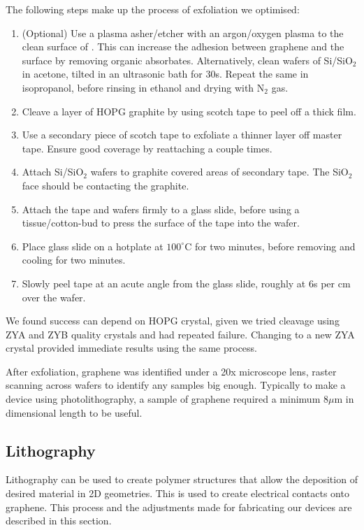 \documentclass[../../Matt_Gebert_Honours_Thesis.tex]{subfiles}
\begin{document}
	The following steps make up the process of exfoliation we optimised:
	\begin{enumerate}
		\itemsep 0em
		\item (Optional) Use a plasma asher/etcher with an argon/oxygen plasma to the clean surface of \silicondioxide. This can increase the adhesion between graphene and the surface by removing organic absorbates\cite{huang_reliable_2015}. Alternatively, clean wafers of Si/SiO$_2$ in acetone, tilted in an ultrasonic bath for 30s. Repeat the same in isopropanol, before rinsing in ethanol and drying with N$_2$ gas.
		\item Cleave a layer of HOPG graphite by using scotch tape to peel off a thick film.
		\item Use a secondary piece of scotch tape to exfoliate a thinner layer off master tape. Ensure good coverage by reattaching a couple times. 
		\item Attach Si/SiO$_2$ wafers to graphite covered areas of secondary tape. The SiO$_2$ face should be contacting the graphite.
		\item Attach the tape and wafers firmly to a glass slide, before using a tissue/cotton-bud to press the surface of the tape into the wafer.
		\item Place glass slide on a hotplate at $100^\circ$C for two minutes, before removing and cooling for two minutes.
		\item Slowly peel tape at an acute angle from the glass slide, roughly at 6s per cm over the wafer.
	\end{enumerate}
	
	We found success can depend on HOPG crystal, given we tried cleavage using ZYA and ZYB quality crystals and had repeated failure. Changing to a new ZYA crystal provided immediate results using the same process.
	
	After exfoliation, graphene was identified under a 20x microscope lens, raster scanning across wafers to identify any samples big enough. Typically to make a device using photolithography, a sample of graphene required a minimum 8$\mu$m in dimensional length to be useful.
	
	\subsection{Lithography}\label{sec:lithography}
	Lithography can be used to create polymer structures that allow the deposition of desired material in 2D geometries. This is used to create electrical contacts onto graphene. This process and the adjustments made for fabricating our devices are described in this section.\newline
	
\end{document}
